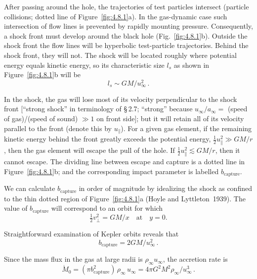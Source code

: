 After passing around the hole, the trajectories of test particles intersect
(particle collisions; dotted line of Figure~\ref{fig:4.8.1}a). In the gas-dynamic case such
intersection of flow lines is prevented by rapidly mounting pressure. Consequently,
a shock front must develop around the black hole (Fig.~\ref{fig:4.8.1}b).
Outside the shock front the flow lines will be hyperbolic test-particle trajectories.
Behind the shock front, they will not. The shock will be located roughly where
potential energy equals kinetic energy, so its characteristic size $l_s$ as shown in
Figure~\ref{fig:4.8.1}b will be
%
\begin{equation}
l_s \sim GM/u_\infty^2\,.
\tag{4.8.2}
\end{equation}

In the shock, the gas will lose most of its velocity perpendicular to the shock
front [``strong shock'' in terminology of \S\,2.7; ``strong'' because $u_\infty/a_\infty ={}$
(speed of gas)/(speed of sound) $\gg 1$ on front side]; but it will retain all of its
velocity parallel to the front (denote this by $u_\|$). For a given gas element, if the
remaining kinetic energy behind the front greatly exceeds the potential energy,
$\frac{1}{2}u_\|^2 \gg GM/r$, then the gas element will escape the pull of the hole. If
$\frac{1}{2}u_\|^2 \lesssim GM/r$, then it cannot escape. The dividing line between escape and
capture is a dotted line in Figure~\ref{fig:4.8.1}b; and the corresponding impact parameter
is labelled $b_\text{capture}$.

We can calculate $b_\text{capture}$ in order of magnitude by idealizing the shock as
confined to the thin dotted region of Figure~\ref{fig:4.8.1}a (Hoyle and Lyttleton~1939).
The value of $b_\text{capture}$ will correspond to an orbit for which
%
\begin{equation}
\tfrac{1}{2}v_\perp^2 = GM/x \quad \text{at}\quad y = 0.
\tag{4.8.3}
\end{equation}

Straightforward examination of Kepler orbits reveals that
%
\begin{equation}
b_\text{capture} = 2GM/u_\infty^2\,.
\tag{4.8.3$'$}
\end{equation}

Since the mass flux in the gas at large radii is $\rho_\infty u_\infty$, the accretion rate is
%
\begin{equation}
\dot{M}_0 = (\pi b_\text{capture}^2)\,\rho_\infty\, u_\infty
= 4\pi G^2 M^2 \rho_\infty / u_\infty^3\,.
\tag{4.8.4}
\end{equation}

